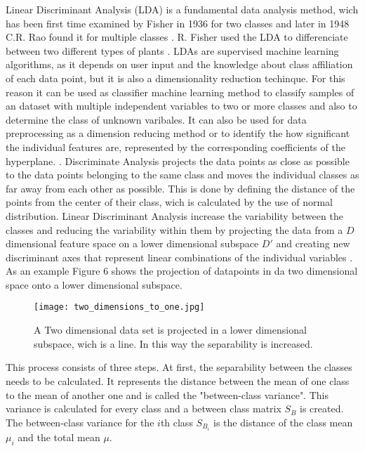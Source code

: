 \documentclass[../masterarbeit.tex]{subfiles}
\begin{document}
Linear Discriminant Analysis (LDA) is a fundamental data analysis method, wich has been first time examined by Fisher in 1936 for two classes and later in 1948 C.R. Rao found it for multiple classes \textcite[]{DEMIR2005421} \textcite[]{analyticsvidhyaLDA:2021} \textcite[]{Xanthopoulos2013}. R. Fisher used the LDA to differenciate between two different types of plants \textcite[]{Xanthopoulos2013}. 
LDAs are supervised machine learning algorithms, as it depends on user input and the knowledge about class affiliation of each data point, but it is also a dimensionality reduction techinque. For this reason it can be used as classifier machine learning method to classify samples of an dataset with multiple independent variables to two or more classes and also to determine the class of unknown varibales. It can also be used for data preprocessing as a dimension reducing method or to identify the how significant the individual features are, represented by the corresponding coefficients of the hyperplane.  \autocite[]{MENDLEIN2013646} \autocite[]{Bahram:2019} \autocite[]{Xanthopoulos2013} \autocite[]{SUBASI202091} \autocite[]{analyticsvidhyaLDA:2021}. 
Discriminate Analysis projects the data points as close as possible to the data points belonging to the same class and moves the individual classes as far away from each other as possible. This is done by defining the distance of the points from the center of their class, wich is calculated by the use of normal distribution. \autocite[]{MENDLEIN2013646} \autocite[]{Bahram:2019} \autocite[]{SUBASI202091} \autocite[]{Xanthopoulos2013}
Linear Discriminant Analysis increase the variability between the classes and reducing the variability within them by projecting the data from a \(D\) dimensional feature space on a lower dimensional subspace \(D'\) and creating new discriminant axes that represent linear combinations of the individual variables \textcite[]{analyticsvidhyaLDA:2021} \textcite[]{DEMIR2005421}. As an example Figure 6 shows  the projection of datapoints in da two dimensional space onto a lower dimensional subspace.\\
\begin{figure}[h]
    \centering
    \texttt{[image: two\_dimensions\_to\_one.jpg]}
    \caption{A Two dimensional data set is projected in a lower dimensional subspace, wich is a line. In this way the separability is increased.}
\end{figure} 
This process consists of three steps. At first, the separability between the classes needs to be calculated. It represents the distance between the mean of one class to the mean of another one and is called the "between-class variance". This variance is calculated for every class and a between class matrix \(S_B\) is created. The between-class variance for the \(i\)th class \(S_{B_i}\) is the distance of the class mean \(\mu_i\) and the total mean \(\mu\). \autocite[]{Tharwat:2017} \\
\end{document}
